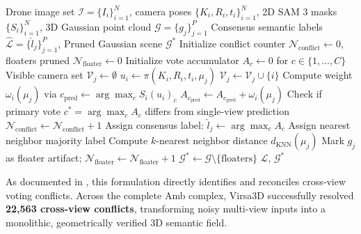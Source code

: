 \documentclass[11pt,a4paper]{article}
\begin{document}
\begin{algorithm}[!htbp]
\caption{Virsa3D Epipolar Multi-View Consensus Voting and Floater Pruning}
\label{alg:consensus}
\begin{algorithmic}[1]
\Require Drone image set $\mathcal{I} = \{I_i\}_{i=1}^N$, camera poses $\{K_i, R_i, t_i\}_{i=1}^N$, 2D SAM 3 masks $\{S_i\}_{i=1}^N$, 3D Gaussian point cloud $\mathcal{G} = \{g_j\}_{j=1}^{P}$
\Ensure Consensus semantic labels $\hat{\mathcal{L}} = \{\hat{l}_j\}_{j=1}^P$, Pruned Gaussian scene $\mathcal{G}^*$
\State Initialize conflict counter $\mathcal{N}_{\text{conflict}} \gets 0$, floaters pruned $\mathcal{N}_{\text{floater}} \gets 0$
    \State Initialize vote accumulator $A_c \gets 0$ for $c \in \{1, \dots, C\}$
    \State Visible camera set $\mathcal{V}_j \gets \emptyset$
        \State $u_i \gets \pi(K_i, R_i, t_i, \mu_j)$
            \State $\mathcal{V}_j \gets \mathcal{V}_j \cup \{i\}$
            \State Compute weight $\omega_i(\mu_j)$ via 
            \State $c_{\text{pred}} \gets \arg\max_c S_i(u_i)_c$
            \State $A_{c_{\text{pred}}} \gets A_{c_{\text{pred}}} + \omega_i(\mu_j)$
        \EndIf
    \EndFor
        \State Check if primary vote $c^* = \arg\max_c A_c$ differs from single-view prediction
            \State $\mathcal{N}_{\text{conflict}} \gets \mathcal{N}_{\text{conflict}} + 1$
        \EndIf
        \State Assign consensus label: $\hat{l}_j \gets \arg\max_c A_c$
    \Else
        \State Assign nearest neighbor majority label
    \EndIf
    \State Compute $k$-nearest neighbor distance $d_{\text{KNN}}(\mu_j)$
        \State Mark $g_j$ as floater artifact; $\mathcal{N}_{\text{floater}} \gets \mathcal{N}_{\text{floater}} + 1$
    \EndIf
\EndFor
\State $\mathcal{G}^* \gets \mathcal{G} \setminus \{\text{floaters}\}$
\State \Return $\hat{\mathcal{L}}$, $\mathcal{G}^*$
\end{algorithmic}
\end{algorithm}

As documented in , this formulation directly identifies and reconciles cross-view voting conflicts. Across the complete Amb complex, Virsa3D successfully resolved \textbf{22,563 cross-view conflicts}, transforming noisy multi-view inputs into a monolithic, geometrically verified 3D semantic field.
\end{document}
